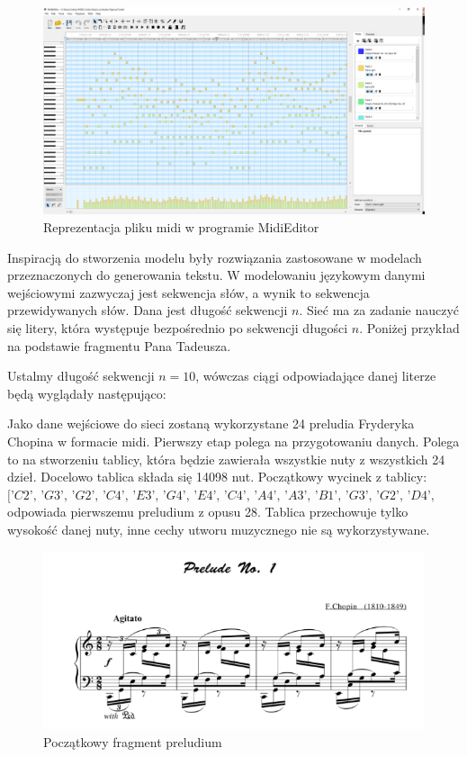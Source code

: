 \begin{figure}[H]
	\centering
	\includegraphics[width=0.8\linewidth]{piano_roll}
	\caption{Reprezentacja pliku midi w programie MidiEditor}
	\label{fig:pianoroll}
\end{figure}

Inspiracją do stworzenia modelu były rozwiązania zastosowane w modelach przeznaczonych do generowania tekstu. W modelowaniu językowym danymi wejściowymi zazwyczaj jest sekwencja słów, a wynik to sekwencja przewidywanych słów. Dana jest długość sekwencji $n$. Sieć ma za zadanie nauczyć się litery, która występuje bezpośrednio po sekwencji długości $n$. Poniżej przykład na podstawie fragmentu Pana Tadeusza.

 


Ustalmy długość sekwencji $n=10$, wówczas ciągi odpowiadające danej literze będą wyglądały następująco:



Jako dane wejściowe do sieci zostaną wykorzystane 24 preludia Fryderyka Chopina w formacie midi. Pierwszy etap polega na przygotowaniu danych. Polega to na stworzeniu tablicy, która będzie zawierała wszystkie nuty z wszystkich 24 dzieł. Docelowo tablica składa się 14098 nut. Początkowy wycinek z tablicy: $\textit{['C2', 'G3', 'G2', 'C4', 'E3', 'G4', 'E4', 'C4', 'A4', 'A3', 'B1', 'G3', 'G2', 'D4', 'F3', 'G4', 'F4', 'D4', 'A4', 'A3']}$ odpowiada pierwszemu preludium z opusu 28. Tablica przechowuje tylko wysokość danej nuty, inne cechy utworu muzycznego nie są wykorzystywane.

\begin{figure}[H]
	\centering
	\includegraphics[width=0.7\linewidth]{prelude_no_1}
	\caption{Początkowy fragment preludium}
	\label{fig:preludeno1}
\end{figure}

